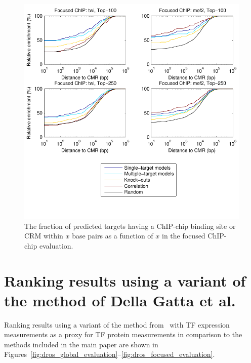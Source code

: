 \documentclass{article}
\begin{document}
\begin{figure}[p]
  \centering
  \includegraphics{dros_binding_site_distances_focused}
  \caption{The fraction of predicted targets having a ChIP-chip
    binding site or CRM within $x$ base pairs as a function of $x$
    in the focused ChIP-chip evaluation.
    \label{fig:dros_binding_site_distances_focused}}
\end{figure}

\section{Ranking results using a variant of the method of Della Gatta et al.}

Ranking results using a variant of the method from~\cite{Gatta2008}
with TF expression measurements as a proxy for TF protein measurements
in comparison to the methods included in the main paper are shown in
Figures~\ref{fig:dros_global_evaluation}--\ref{fig:dros_focused_evaluation}.
\end{document}
